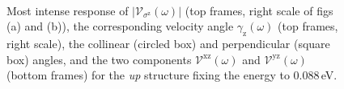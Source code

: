 \documentclass[prb,11pt,tightenlines,twocolumn,aps]{revtex4-1}
\begin{document}
\begin{figure}[t]
    \centering
    \\

    \caption{Most intense response of
    $|\mathcal{V}_{\sigma^{\mathrm{z}}}(\omega)|$ (top frames, right scale of
    figs (a) and (b)), the corresponding velocity angle
    $\gamma_{\mathrm{z}}(\omega)$ (top frames, right scale), the collinear
    (circled box) and perpendicular (square box) angles, and the two components
    $\mathcal{V}^{\mathrm{xz}}(\omega)$ and $\mathcal{V}^{\mathrm{yz}}(\omega)$
    (bottom frames) for the \emph{up} structure fixing the energy to 0.088\,eV.
    }
    \label{fig:up-vaz-rag}
\end{figure}
\end{document}
